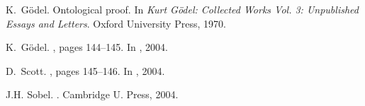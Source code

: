 \documentclass{llncs}
\begin{document}
\begin{thebibliography}{10}

K.~G\"odel.
\newblock Ontological proof.
\newblock In {\em {Kurt G\"odel: Collected Works Vol. 3: Unpublished Essays and
  Letters}}. Oxford University Press, 1970.

K.~G\"odel.
, pages 144--145.
\newblock In  \cite{sobel2004logic}, 2004.





D.~Scott.
, pages 145--146.
\newblock In  \cite{sobel2004logic}, 2004.

J.H. Sobel.
.
\newblock Cambridge U. Press, 2004.


\end{thebibliography}
\end{document}
